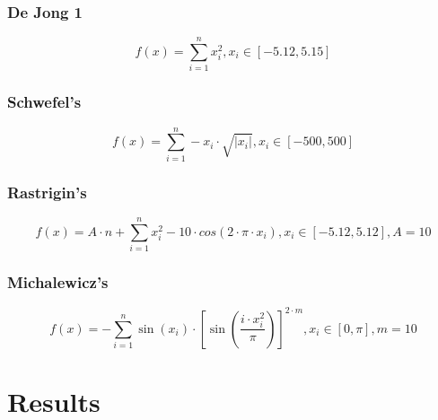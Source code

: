 \documentclass{article}
\begin{document}
\subsubsection{De Jong 1}
    $$ f(x) = \sum_{i=1}^n x_i^2, x_i \in \left[ -5.12 , 5.15 \right] $$

\subsubsection{Schwefel's}
    $$ f(x) = \sum_{i=1}^n -x_i \cdot \sqrt{ \left\lvert x_i\right\rvert }, x_i \in \left[ -500 , 500 \right] $$

\subsubsection{Rastrigin's}
    $$ f(x) = A \cdot n + \sum_{i=1}^n x_i^2 - 10 \cdot cos(2 \cdot \pi \cdot x_i) , x_i \in \left[ -5.12 , 5.12 \right] , A = 10 $$

\subsubsection{Michalewicz's}
    $$ f(x) = - \sum_{i = 1}^{n} \sin(x_i) \cdot \left[ \sin( \frac{i \cdot x_i^2}{\pi} ) \right] ^ {2 \cdot m }, x_i \in \left[ 0 , \pi \right] , m = 10  $$

\section{Results}
\end{document}
